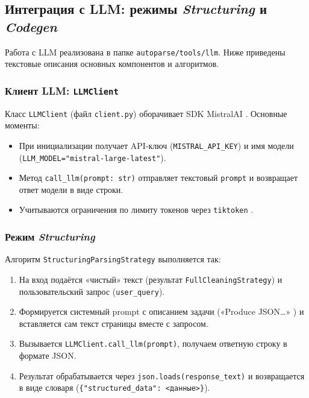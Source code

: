 \subsection{Интеграция с LLM: режимы \emph{Structuring} и \emph{Codegen}}
\label{subsec:solution3}

Работа с LLM реализована в папке \texttt{autoparse/tools/llm}. Ниже приведены текстовые описания основных компонентов и алгоритмов.

\subsubsection{Клиент LLM: \texttt{LLMClient}}
\label{sssec:llmclient}

Класс \texttt{LLMClient} (файл \texttt{client.py}) оборачивает SDK MistralAI \cite{MistralAIDocumentation}. Основные моменты:
\begin{itemize}
    \item При инициализации получает API-ключ (\texttt{MISTRAL\_API\_KEY}) и имя модели (\texttt{LLM\_MODEL="mistral-large-latest"}).
    \item Метод \texttt{call\_llm(prompt: str)} отправляет текстовый \texttt{prompt} и возвращает ответ модели в виде строки.
    \item Учитываются ограничения по лимиту токенов через \texttt{tiktoken} \cite{TiktokenDocumentation}.
\end{itemize}

\subsubsection{Режим \emph{Structuring}}
\label{sssec:structuring}

Алгоритм \texttt{StructuringParsingStrategy} выполняется так:
\begin{enumerate}
    \item На вход подаётся «чистый» текст (результат \texttt{FullCleaningStrategy}) и пользовательский запрос (\texttt{user\_query}).
    \item Формируется системный prompt с описанием задачи («Produce JSON…» \cite{Brown2020}) и вставляется сам текст страницы вместе с запросом.
    \item Вызывается \texttt{LLMClient.call\_llm(prompt)}, получаем ответную строку в формате JSON.
    \item Результат обрабатывается через \texttt{json.loads(response\_text)} и возвращается в виде словаря (\texttt{\{"structured\_data": <данные>\}}).
\end{enumerate}

